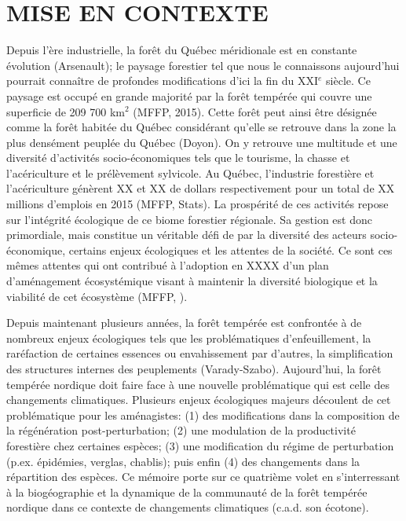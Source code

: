 
\section*{\uppercase{Mise en contexte}}

Depuis l'ère industrielle, la forêt du Québec méridionale est en constante évolution (Arsenault); le
paysage forestier tel que nous le connaissons aujourd'hui pourrait connaître de profondes
modifications d'ici la fin du XXI$^e$ siècle. Ce paysage est occupé en grande majorité par la forêt
tempérée qui couvre une superficie de 209 700 km$^2$ (MFFP, 2015). Cette forêt peut ainsi être
désignée comme la forêt habitée du Québec considérant qu'elle se retrouve dans la zone la plus
densément peuplée du Québec (Doyon). On y retrouve une multitude et une diversité d'activités
socio-économiques tels que le tourisme, la chasse et l'acériculture et le prélèvement sylvicole. Au
Québec, l'industrie forestière et l'acériculture génèrent XX et XX de dollars respectivement pour un
total de XX millions d'emplois en 2015 (MFFP, Stats). La prospérité de ces activités repose sur
l'intégrité écologique de ce biome forestier régionale. Sa gestion est donc primordiale, mais
constitue un véritable défi de par la diversité des acteurs socio-économique, certains enjeux
écologiques et les attentes de la société. Ce sont ces mêmes attentes qui ont contribué à l'adoption
en XXXX d'un plan d'aménagement écosystémique visant à maintenir la diversité biologique et la
viabilité de cet écosystème (MFFP, ).

Depuis maintenant plusieurs années, la forêt tempérée est confrontée à de nombreux enjeux
écologiques tels que les problématiques d'enfeuillement, la raréfaction de certaines essences ou
envahissement par d’autres, la simplification des structures internes des peuplements
(Varady-Szabo). Aujourd'hui, la forêt tempérée nordique doit faire face à une nouvelle problématique
qui est celle des changements climatiques. Plusieurs enjeux écologiques majeurs découlent de cet
problématique pour les aménagistes: (1) des modifications dans la composition de la régénération
post-perturbation; (2) une modulation de la productivité forestière chez certaines espèces; (3) une
modification du régime de perturbation (p.ex. épidémies, verglas, chablis); puis enfin (4) des
changements dans la répartition des espèces. Ce mémoire porte sur ce quatrième volet en s'interressant à la biogéographie et la dynamique de la communauté de la forêt tempérée
nordique dans ce contexte de changements climatiques (c.a.d. son écotone).

